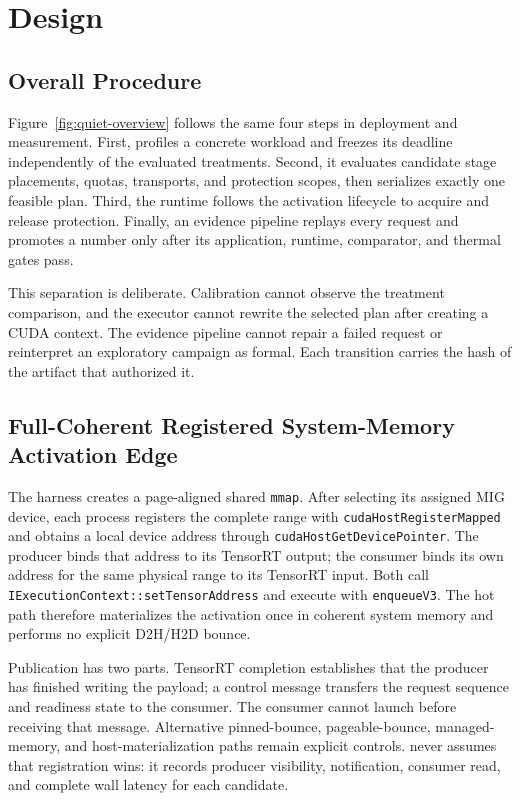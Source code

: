 \section{\sys Design}
\label{sec:design}

\subsection{Overall Procedure}

Figure~\ref{fig:quiet-overview} follows the same four steps in deployment and
measurement.  First, \sys profiles a concrete workload and freezes its
deadline independently of the evaluated treatments.  Second, it evaluates
candidate stage placements, quotas, transports, and protection scopes, then
serializes exactly one feasible plan.  Third, the runtime follows the
activation lifecycle to acquire and release protection.  Finally, an evidence
pipeline replays every request and promotes a number only after its application,
runtime, comparator, and thermal gates pass.

This separation is deliberate.  Calibration cannot observe the treatment
comparison, and the executor cannot rewrite the selected plan after creating a
CUDA context.  The evidence pipeline cannot repair a failed request or
reinterpret an exploratory campaign as formal.  Each transition carries the
hash of the artifact that authorized it.

\subsection{Full-Coherent Registered System-Memory Activation Edge}
\label{sec:edge}

The harness creates a page-aligned shared \texttt{mmap}.  After selecting its
assigned MIG device, each process registers the complete range with
\texttt{cudaHostRegisterMapped} and obtains a local device address through
\texttt{cudaHostGetDevicePointer}.  The producer binds that address to its
TensorRT output; the consumer binds its own address for the same physical
range to its TensorRT input.  Both call
\texttt{IExecutionContext::setTensorAddress} and execute with
\texttt{enqueueV3}.  The hot path therefore materializes the activation once
in coherent system memory and performs no explicit D2H/H2D bounce.

Publication has two parts.  TensorRT completion establishes that the producer
has finished writing the payload; a control message transfers the request
sequence and readiness state to the consumer.  The consumer cannot launch
before receiving that message.  Alternative pinned-bounce, pageable-bounce,
managed-memory, and host-materialization paths remain explicit controls.
\sys never assumes that registration wins: it records producer visibility,
notification, consumer read, and complete wall latency for each candidate.

